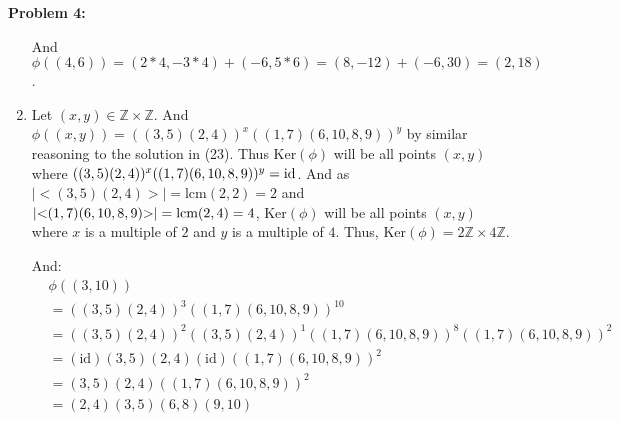 \documentclass[12pt, letterpaper]{article}
\newenvironment{problem}
    [1]
    {\noindent \textbf{Problem #1:}}
    {\vspace{3mm}}
\begin{document}
\begin{problem}{4}
\begin{enumerate}
        \bigskip\noindent
        And $\phi((4, 6)) = (2*4, -3*4) + (-6, 5*6) = (8, -12) + (-6, 30) = (2, 18)$.

        \item Let $(x, y) \in \mathbb{Z} \times \mathbb{Z}$. And $\phi((x, y)) = ((3,5)(2,4))^x((1,7)(6,10,8,9))^y$
        by similar reasoning to the solution in (23). Thus $\text{Ker}(\phi)$ will be all points $(x,y)$ where
        $((3,5)(2,4))^x\\((1,7)(6,10,8,9))^y = \text{id}$. And as $|{<}(3,5)(2,4){>}| = \text{lcm}(2, 2) = 2$ and 
        $|{<}(1,7)\\(6,10,8,9){>}| = \text{lcm}(2, 4) = 4$, $\text{Ker}(\phi)$ will be all points $(x, y)$ where $x$
        is a multiple of $2$ and $y$ is a multiple of $4$. Thus, $\text{Ker}(\phi) = 2\mathbb{Z} \times 
        4\mathbb{Z}$.

        \bigskip\noindent
        And: 
        \begin{align*} 
            &\phi((3,10))\\ 
            &= ((3,5)(2,4))^3((1,7)(6,10,8,9))^{10}\\ 
            &= ((3,5)(2,4))^2((3,5)(2,4))^1 ((1,7)(6,10,8,9))^8((1,7)(6,10,8,9))^2\\ 
            &= (\text{id})(3,5)(2,4)(\text{id})((1,7)(6,10,8,9))^2\\ 
            &= (3,5)(2,4)((1,7)(6,10,8,9))^2\\
            &= (2,4)(3,5)(6,8)(9,10)
        \end{align*}
    \end{enumerate}
\end{problem}
\end{document}
